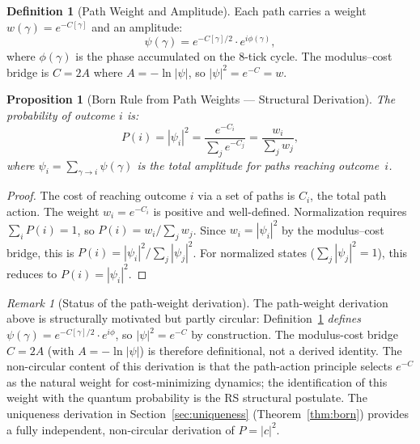 \documentclass[12pt,a4paper]{article}
\newtheorem{proposition}[theorem]{Proposition}
\theoremstyle{definition}
\newtheorem{definition}[theorem]{Definition}
\theoremstyle{remark}
\newtheorem{remark}[theorem]{Remark}
\begin{document}
\begin{definition}[Path Weight and Amplitude]
\label{def:weight}
Each path carries a weight $w(\gamma) = e^{-C[\gamma]}$ and an
amplitude:
\begin{equation}
  \psi(\gamma) = e^{-C[\gamma]/2} \cdot e^{i\phi(\gamma)},
\end{equation}
where $\phi(\gamma)$ is the phase accumulated on the 8-tick
cycle.  The modulus--cost bridge is $C = 2A$ where
$A = -\ln|\psi|$, so $|\psi|^2 = e^{-C} = w$.
\end{definition}

\begin{proposition}[Born Rule from Path Weights --- Structural Derivation]
\label{thm:born-path}
The probability of outcome $i$ is:
\begin{equation}
  \boxed{P(i) = |\psi_i|^2
  = \frac{e^{-C_i}}{\sum_j e^{-C_j}}
  = \frac{w_i}{\sum_j w_j},}
\end{equation}
where $\psi_i = \sum_{\gamma \to i} \psi(\gamma)$ is the total
amplitude for paths reaching outcome~$i$.
\end{proposition}

\begin{proof}
The cost of reaching outcome $i$ via a set of paths is
$C_i$, the total path action.  The weight $w_i = e^{-C_i}$
is positive and well-defined.  Normalization requires
$\sum_i P(i) = 1$, so $P(i) = w_i / \sum_j w_j$.  Since
$w_i = |\psi_i|^2$ by the modulus--cost bridge, this is
$P(i) = |\psi_i|^2 / \sum_j |\psi_j|^2$.  For normalized
states ($\sum_j |\psi_j|^2 = 1$), this reduces to
$P(i) = |\psi_i|^2$.
\end{proof}

\begin{remark}[Status of the path-weight derivation]
\label{rem:path-circular}
The path-weight derivation above is structurally motivated but partly
circular: Definition~\ref{def:weight} \emph{defines} $\psi(\gamma) =
e^{-C[\gamma]/2} \cdot e^{i\phi}$, so $|\psi|^2 = e^{-C}$ by
construction.  The modulus-cost bridge $C = 2A$ (with $A = -\ln|\psi|$)
is therefore definitional, not a derived identity.  The non-circular
content of this derivation is that the path-action principle selects
$e^{-C}$ as the natural weight for cost-minimizing dynamics; the
identification of this weight with the quantum probability is the
RS structural postulate.  The uniqueness derivation in
Section~\ref{sec:uniqueness} (Theorem~\ref{thm:born}) provides a
fully independent, non-circular derivation of $P = |c|^2$.
\end{remark}
\end{document}
